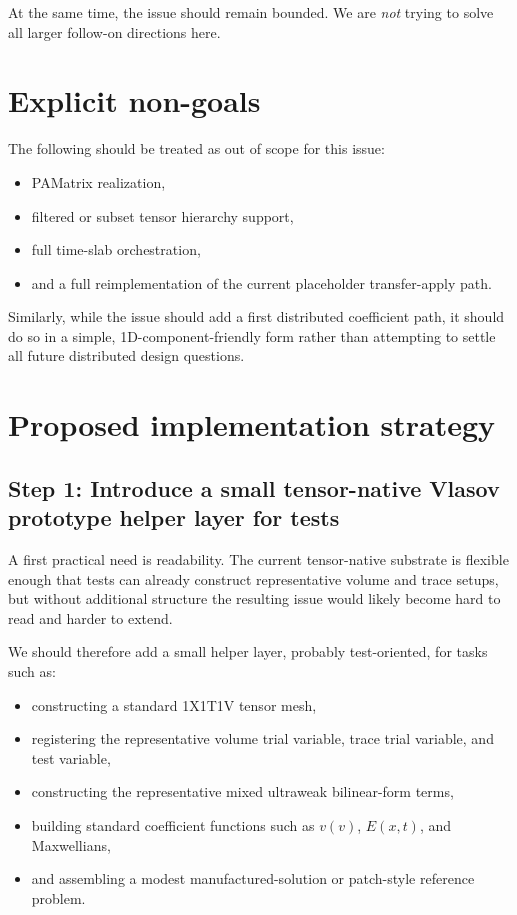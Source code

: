 \documentclass[11pt]{article}
\begin{document}
At the same time, the issue should remain bounded. We are \emph{not} trying to solve all larger follow-on directions here.

\section{Explicit non-goals}

The following should be treated as out of scope for this issue:
\begin{itemize}[leftmargin=2em]
\item PAMatrix realization,
\item filtered or subset tensor hierarchy support,
\item full time-slab orchestration,
\item and a full reimplementation of the current placeholder transfer-apply path.
\end{itemize}

Similarly, while the issue should add a first distributed coefficient path, it should do so in a simple, 1D-component-friendly form rather than attempting to settle all future distributed design questions.

\section{Proposed implementation strategy}

\subsection{Step 1: Introduce a small tensor-native Vlasov prototype helper layer for tests}

A first practical need is readability. The current tensor-native substrate is flexible enough that tests can already construct representative volume and trace setups, but without additional structure the resulting issue would likely become hard to read and harder to extend.

We should therefore add a small helper layer, probably test-oriented, for tasks such as:
\begin{itemize}[leftmargin=2em]
\item constructing a standard 1X1T1V tensor mesh,
\item registering the representative volume trial variable, trace trial variable, and test variable,
\item constructing the representative mixed ultraweak bilinear-form terms,
\item building standard coefficient functions such as \(v(v)\), \(E(x,t)\), and Maxwellians,
\item and assembling a modest manufactured-solution or patch-style reference problem.
\end{itemize}
\end{document}
